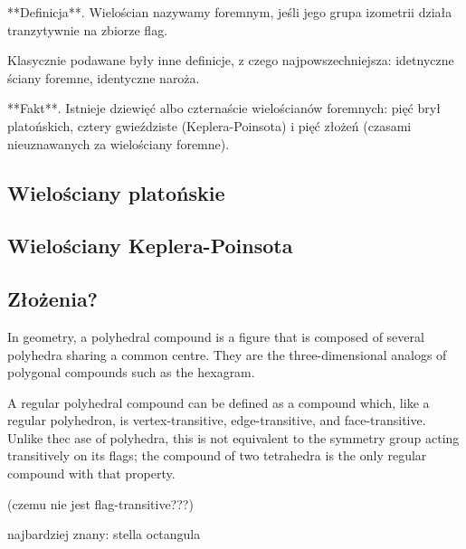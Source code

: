 **Definicja**. Wielościan nazywamy foremnym, jeśli jego grupa izometrii działa tranzytywnie na zbiorze flag.

Klasycznie podawane były inne definicje, z czego najpowszechniejsza: idetnyczne ściany foremne, identyczne naroża.

**Fakt**. Istnieje dziewięć albo czternaście wielościanów foremnych: pięć brył platońskich, cztery gwieździste (Keplera-Poinsota) i pięć złożeń (czasami nieuznawanych za wielościany foremne).


\subsection{Wielościany platońskie}


\subsection{Wielościany Keplera-Poinsota}


\subsection{Złożenia?}
In geometry, a polyhedral compound is a figure that is composed of several polyhedra sharing a common centre. They are the three-dimensional analogs of polygonal compounds such as the hexagram.

A regular polyhedral compound can be defined as a compound which, like a regular polyhedron, is vertex-transitive, edge-transitive, and face-transitive. Unlike thec ase of polyhedra, this is not equivalent to the symmetry group acting transitively on its flags; the compound of two tetrahedra is the only regular compound with that property.

(czemu nie jest flag-transitive???)

najbardziej znany: stella octangula



